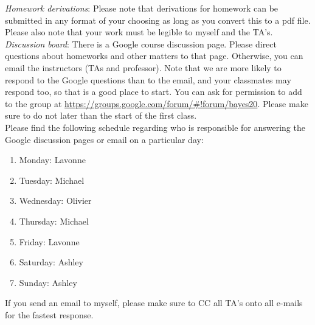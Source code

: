 \documentclass[11pt]{article}
\begin{document}
\emph{Homework derivations}: Please note that derivations for homework can be submitted in any format of your choosing as long as you convert this to a pdf file. Please also note that your work must be legible to myself and the TA's. \\


\emph{Discussion board}:
There is a Google course discussion page. Please direct questions about homeworks and other matters to that page. Otherwise, you can email the instructors (TAs and professor). Note that we are more likely to respond to the Google questions than to the email, and your classmates may respond too, so that is a good place to start. You can ask for permission to add to the group at \url{https://groups.google.com/forum/#!forum/bayes20}. Please make sure to do not later than the start of the first class.\\


Please find the following schedule regarding who is responsible for answering the Google discussion pages or email on a particular day:

\begin{enumerate}
\item Monday: Lavonne
\item Tuesday: Michael
\item Wednesday: Olivier
\item Thursday: Michael
\item Friday: Lavonne 
\item Saturday: Ashley
\item Sunday: Ashley
\end{enumerate}

If you send an email to myself, please make sure to CC all TA's onto all e-mails for the fastest response.\\
\end{document}
